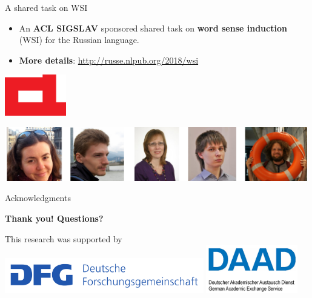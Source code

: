 \begin{frame}{A shared task on WSI}
  
  \begin{itemize}
  \item An \textbf{\alert{ACL SIGSLAV}} sponsored shared task on \textbf{word sense induction} (WSI) for the Russian language.
 \end{itemize} 
  
%  
  \begin{itemize}
    \item \textbf{More details}: \url{http://russe.nlpub.org/2018/wsi}
     
  \end{itemize}
  
  \begin{center}
  	\includegraphics[width=0.2\textwidth]{figures/acl}
  \end{center}
  
   \begin{center}
  	\includegraphics[width=0.99\textwidth]{figures/russe-team}
  \end{center}
\end{frame}

\begin{frame}{Acknowledgments}

{\Huge \textbf{Thank you! \alert{Questions?}}}

\vspace{2em}

{\normalsize This research was supported by}
\includegraphics[width=0.65\textwidth]{figures/dfg} \includegraphics[width=0.3\textwidth]{figures/daad}

\end{frame}


